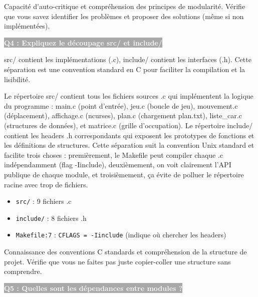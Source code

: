 \documentclass[12pt,a4paper]{article}
\newcommand{\question}[1]{%
    \vspace{0.5cm}
    \noindent\colorbox{darkgray}{\textcolor{white}{\textbf{#1}}}
    \vspace{0.3cm}
}
\begin{document}
\begin{objectif_prof}
Capacité d'auto-critique et compréhension des principes de modularité. Vérifie que vous savez identifier les problèmes et proposer des solutions (même si non implémentées).
\end{objectif_prof}

\question{Q4 : Expliquez le découpage src/ et include/}

\begin{reponse_courte}
src/ contient les implémentations (.c), include/ contient les interfaces (.h). Cette séparation est une convention standard en C pour faciliter la compilation et la lisibilité.
\end{reponse_courte}

\begin{reponse_longue}
Le répertoire src/ contient tous les fichiers sources .c qui implémentent la logique du programme : main.c (point d'entrée), jeu.c (boucle de jeu), mouvement.c (déplacement), affichage.c (ncurses), plan.c (chargement plan.txt), liste\_car.c (structures de données), et matrice.c (grille d'occupation). Le répertoire include/ contient les headers .h correspondants qui exposent les prototypes de fonctions et les définitions de structures. Cette séparation suit la convention Unix standard et facilite trois choses : premièrement, le Makefile peut compiler chaque .c indépendamment (flag -Iinclude), deuxièmement, on voit clairement l'API publique de chaque module, et troisièmement, ça évite de polluer le répertoire racine avec trop de fichiers.
\end{reponse_longue}

\begin{reference_code}
\begin{itemize}
    \item \texttt{src/} : 9 fichiers .c
    \item \texttt{include/} : 8 fichiers .h
    \item \texttt{Makefile:7} : \texttt{CFLAGS = -Iinclude} (indique où chercher les headers)
\end{itemize}
\end{reference_code}

\begin{objectif_prof}
Connaissance des conventions C standards et compréhension de la structure de projet. Vérifie que vous ne faites pas juste copier-coller une structure sans comprendre.
\end{objectif_prof}

\question{Q5 : Quelles sont les dépendances entre modules ?}
\end{document}

